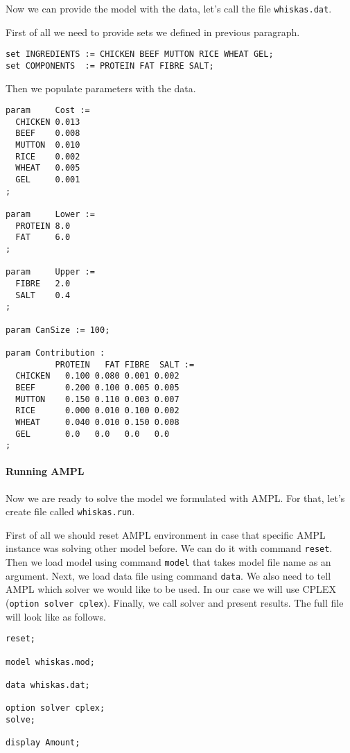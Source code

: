 Now we can provide the model with the data, let's call the file \texttt{whiskas.dat}.

First of all we need to provide sets we defined in previous paragraph.
\begin{lstlisting}
set INGREDIENTS := CHICKEN BEEF MUTTON RICE WHEAT GEL;
set COMPONENTS  := PROTEIN FAT FIBRE SALT;
\end{lstlisting}

Then we populate parameters with the data.
\begin{lstlisting}
param     Cost :=
  CHICKEN 0.013
  BEEF    0.008
  MUTTON  0.010
  RICE    0.002
  WHEAT   0.005
  GEL     0.001
;

param     Lower :=
  PROTEIN 8.0
  FAT     6.0
;

param     Upper :=
  FIBRE   2.0
  SALT    0.4
;

param CanSize := 100;

param Contribution :
          PROTEIN   FAT FIBRE  SALT :=
  CHICKEN   0.100 0.080 0.001 0.002 
  BEEF      0.200 0.100 0.005 0.005 
  MUTTON    0.150 0.110 0.003 0.007 
  RICE      0.000 0.010 0.100 0.002 
  WHEAT     0.040 0.010 0.150 0.008 
  GEL       0.0   0.0   0.0   0.0   
;
\end{lstlisting} 

\paragraph{Running AMPL}

Now we are ready to solve the model we formulated with AMPL. For that, let's create file called \texttt{whiskas.run}.

First of all we should reset AMPL environment in case that specific AMPL instance was solving other model before. We can do it with command \texttt{reset}. Then we load model using command \texttt{model} that takes model file name as an argument. Next, we load data file using command \texttt{data}. We also need to tell AMPL which solver we would like to be used. In our case we will use CPLEX (\texttt{option solver cplex}). Finally, we call solver and present results. The full file will look like as follows.

\begin{lstlisting}
reset;

model whiskas.mod;

data whiskas.dat;

option solver cplex;
solve;

display Amount;
\end{lstlisting}

